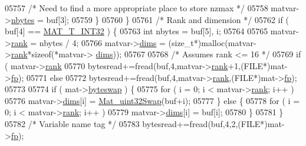 \begin{DoxyCode}
{{{{{{{{{{{{{{{{{{{{{{{{{{{{{{{{{{{05757                    \textcolor{comment}{/* Need to find a more appropriate place to store nzmax */}
05758                    matvar->\hyperlink{group___m_a_t_abf1c844540503be2df9bb3db93cfe307}{nbytes} = buf[3];
05759                \}
05760             \}
05761             \textcolor{comment}{/* Rank and dimension */}
05762             \textcolor{keywordflow}{if} ( buf[4] == \hyperlink{group___m_a_t_ggacf7b3b879282b7ab3a51190e49bf3453a83e06a68320726c6572bfbb9f3addb1d}{MAT\_T\_INT32} ) \{
05763                 \textcolor{keywordtype}{int} nbytes = buf[5], i;
05764 
05765                 matvar->\hyperlink{group___m_a_t_a84ba70c96ded13cc555fa75b768d9921}{rank} = nbytes / 4;
05766                 matvar->\hyperlink{group___m_a_t_a8e01234e1c862ce3472bb37f5a09b92c}{dims} = (\textcolor{keywordtype}{size\_t}*)malloc(matvar->\hyperlink{group___m_a_t_a84ba70c96ded13cc555fa75b768d9921}{rank}*\textcolor{keyword}{sizeof}(*matvar->
      \hyperlink{group___m_a_t_a8e01234e1c862ce3472bb37f5a09b92c}{dims}));
05767 
05768                 \textcolor{comment}{/* Assumes rank <= 16 */}
05769                 \textcolor{keywordflow}{if} ( matvar->\hyperlink{group___m_a_t_a84ba70c96ded13cc555fa75b768d9921}{rank} %
05770                     bytesread+=fread(buf,4,matvar->\hyperlink{group___m_a_t_a84ba70c96ded13cc555fa75b768d9921}{rank}+1,(FILE*)mat->\hyperlink{struct__mat__t_a85f562e407ca9ad4d2a6e14f839432b7}{fp});
05771                 \textcolor{keywordflow}{else}
05772                     bytesread+=fread(buf,4,matvar->\hyperlink{group___m_a_t_a84ba70c96ded13cc555fa75b768d9921}{rank},(FILE*)mat->\hyperlink{struct__mat__t_a85f562e407ca9ad4d2a6e14f839432b7}{fp});
05773 
05774                 \textcolor{keywordflow}{if} ( mat->\hyperlink{struct__mat__t_a99d207977af5e04941ace56d71817a40}{byteswap} ) \{
05775                     \textcolor{keywordflow}{for} ( i = 0; i < matvar->\hyperlink{group___m_a_t_a84ba70c96ded13cc555fa75b768d9921}{rank}; i++ )
05776                         matvar->\hyperlink{group___m_a_t_a8e01234e1c862ce3472bb37f5a09b92c}{dims}[i] = \hyperlink{endian_8c_a8cb0d0750e2eaf9840d95db531934f4f}{Mat\_uint32Swap}(buf+i);
05777                 \} \textcolor{keywordflow}{else} \{
05778                     \textcolor{keywordflow}{for} ( i = 0; i < matvar->\hyperlink{group___m_a_t_a84ba70c96ded13cc555fa75b768d9921}{rank}; i++ )
05779                         matvar->\hyperlink{group___m_a_t_a8e01234e1c862ce3472bb37f5a09b92c}{dims}[i] = buf[i];
05780                 \}
05781             \}
05782             \textcolor{comment}{/* Variable name tag */}
05783             bytesread+=fread(buf,4,2,(FILE*)mat->\hyperlink{struct__mat__t_a85f562e407ca9ad4d2a6e14f839432b7}{fp});
}}}}}}}}}}}}}}}}}}}}}}}}}}}}}}}}}}}
\end{DoxyCode}

